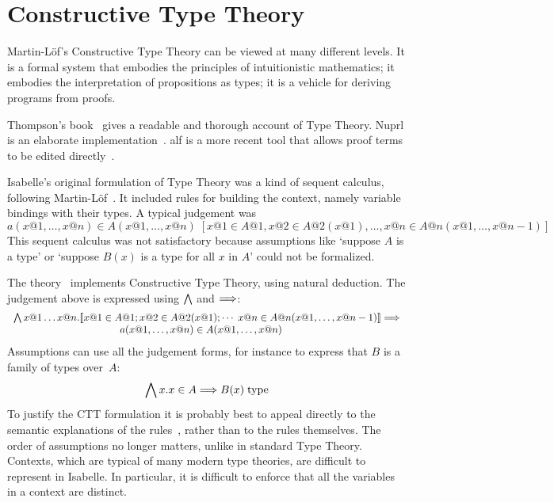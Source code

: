 \chapter{Constructive Type Theory}

\underscoreoff %

Martin-L\"of's Constructive Type Theory \cite{martinlof84,nordstrom90} can
be viewed at many different levels.  It is a formal system that embodies
the principles of intuitionistic mathematics; it embodies the
interpretation of propositions as types; it is a vehicle for deriving
programs from proofs.  

Thompson's book~\cite{thompson91} gives a readable and thorough account of
Type Theory.  Nuprl is an elaborate implementation~\cite{constable86}.
{\sc alf} is a more recent tool that allows proof terms to be edited
directly~\cite{alf}.

Isabelle's original formulation of Type Theory was a kind of sequent
calculus, following Martin-L\"of~\cite{martinlof84}.  It included rules for
building the context, namely variable bindings with their types.  A typical
judgement was
\[   a(x@1,\ldots,x@n)\in A(x@1,\ldots,x@n) \; 
    [ x@1\in A@1, x@2\in A@2(x@1), \ldots, x@n\in A@n(x@1,\ldots,x@{n-1}) ]
\]
This sequent calculus was not satisfactory because assumptions like
`suppose $A$ is a type' or `suppose $B(x)$ is a type for all $x$ in $A$'
could not be formalized.  

The theory~ implements Constructive Type Theory, using
natural deduction.  The judgement above is expressed using $\bigwedge$ and
$\Longrightarrow$:
\[ \begin{array}{r@{}l}
     \Forall x@1\ldots x@n. &
          \List{x@1\in A@1; 
                x@2\in A@2(x@1); \cdots \; 
                x@n\in A@n(x@1,\ldots,x@{n-1})} \Imp \\
     &  \qquad\qquad a(x@1,\ldots,x@n)\in A(x@1,\ldots,x@n) 
    \end{array}
\]
Assumptions can use all the judgement forms, for instance to express that
$B$ is a family of types over~$A$:
\[ \bigwedge x . x\in A \Longrightarrow B(x)\;{\rm type} \]
To justify the CTT formulation it is probably best to appeal directly to the
semantic explanations of the rules~\cite{martinlof84}, rather than to the
rules themselves.  The order of assumptions no longer matters, unlike in
standard Type Theory.  Contexts, which are typical of many modern type
theories, are difficult to represent in Isabelle.  In particular, it is
difficult to enforce that all the variables in a context are distinct.

